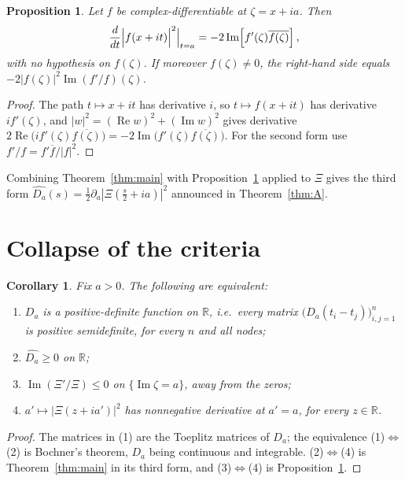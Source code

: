 \documentclass[11pt,a4paper]{amsart}
\theoremstyle{plain}
\newtheorem{proposition}[theorem]{Proposition}
\newtheorem{corollary}[theorem]{Corollary}
\theoremstyle{definition}
\newcommand{\RR}{\mathbb{R}}
\newcommand{\Xii}{\Xi}
\begin{document}
\begin{proposition}\label{prop:deriv}
Let $f$ be complex-differentiable at $\zeta=x+ia$. Then
\[
  \frac{d}{dt}\Bigl|f(x+it)\Bigr|^2\Big|_{t=a}
  =-2\operatorname{Im}\!\left[f'(\zeta)\overline{f(\zeta)}\right],
\]
with no hypothesis on $f(\zeta)$. If moreover $f(\zeta)\neq0$, the right-hand side equals
$-2|f(\zeta)|^2\operatorname{Im}(f'/f)(\zeta)$.
\end{proposition}

\begin{proof}
The path $t\mapsto x+it$ has derivative $i$, so $t\mapsto f(x+it)$ has derivative $if'(\zeta)$, and
$|w|^2=(\operatorname{Re}w)^2+(\operatorname{Im}w)^2$ gives derivative
$2\operatorname{Re}\bigl(if'(\zeta)\overline{f(\zeta)}\bigr)=-2\operatorname{Im}\bigl(f'(\zeta)\overline{f(\zeta)}\bigr)$.
For the second form use $f'/f=f'\overline f/|f|^2$.
\end{proof}

Combining Theorem~\ref{thm:main} with Proposition~\ref{prop:deriv} applied to $\Xii$ gives the third
form $\widehat{D_a}(s)=\tfrac12\partial_a|\Xii(\tfrac s2+ia)|^2$ announced in Theorem~\ref{thm:A}.

\section{Collapse of the criteria}

\begin{corollary}\label{cor:collapse}
Fix $a>0$. The following are equivalent:
\begin{enumerate}
\item $D_a$ is a positive-definite function on $\RR$, i.e.\ every matrix
  $\bigl(D_a(t_i-t_j)\bigr)_{i,j=1}^n$ is positive semidefinite, for every $n$ and all nodes;
\item $\widehat{D_a}\ge0$ on $\RR$;
\item $\operatorname{Im}(\Xii'/\Xii)\le0$ on $\{\operatorname{Im}\zeta=a\}$, away from the zeros;
\item $a'\mapsto|\Xii(z+ia')|^2$ has nonnegative derivative at $a'=a$, for every $z\in\RR$.
\end{enumerate}
\end{corollary}

\begin{proof}
The matrices in (1) are the Toeplitz matrices of $D_a$; the equivalence (1)$\iff$(2) is Bochner's
theorem, $D_a$ being continuous and integrable. (2)$\iff$(4) is Theorem~\ref{thm:main} in its third
form, and (3)$\iff$(4) is Proposition~\ref{prop:deriv}.
\end{proof}
\end{document}
